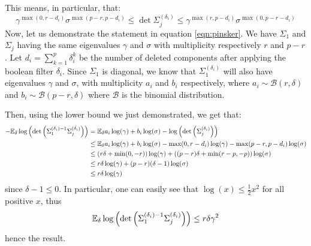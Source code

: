 \documentclass{article}
\numberwithin{equation}{section}
\numberwithin{equation}{section}
\begin{document}
            This means, in particular, that:
            \begin{equation}
                \gamma^{\max (0, r-d_i)} \sigma^{\max(p-r, p-d_i)} \leq \det \Sigma_j^{(\delta_i)} \leq \gamma^{\max (r, p-d_i)} \sigma^{\max(0, p-r-d_i)} 
            \end{equation}
            Now, let us demonstrate the statement in equation \ref{eqn:pinsker}. We have $\Sigma_1$ and $\Sigma_j$ having the same eigenvalues $\gamma$ and $\sigma$ with multiplicity respectively $r$ and $p-r$. Let $d_i = \sum_{k=1}^p \delta_i^k$ be the number of deleted components after applying the boolean filter $\delta_i$. Since $\Sigma_1$ is diagonal, we know that $\Sigma_1^{(\delta_i)}$ will also have eigenvalues $\gamma$ and $\sigma$, with multiplicity $a_i$ and $b_i$ respectively, where $a_i \sim \mathcal{B}(r, \delta)$ and $b_i \sim \mathcal{B}(p-r, \delta)$ where $\mathcal{B}$ is the binomial distribution.
            
            Then, using the lower bound we just demonstrated, we get that:
            \begin{equation}
                \begin{split}
                - \mathbb{E}_\delta \log \left(\det \left(\Sigma_1^{(\delta_i)-1} \Sigma_j^{(\delta_i)} \right) \right) & = \mathbb{E}_\delta a_i \log(\gamma) + b_i \log(\sigma) - \log \left( \det \left(\Sigma_j^{(\delta_i)} \right)\right)\\
                & \leq \mathbb{E}_\delta a_i \log(\gamma) + b_i \log(\sigma) -  \max (0, r-d_i)\log(\gamma) - \max(p-r, p-d_i)\log ( \sigma ) \\
                & \leq \left( r\delta + \min (0, -r) \right) \log (\gamma) + \left( (p-r)\delta + \min(r-p, - p)\right) \log (\sigma)\\
                & \leq r \delta \log(\gamma) + (p-r)(\delta - 1) \log(\sigma)\\
                & \leq r \delta \log(\gamma)
                \end{split}
            \end{equation}
            since $\delta - 1 \leq 0$. In particular, one can easily see that $\log(x) \leq \frac{1}{2} x^2$ for all positive $x$, thus
            \begin{equation}
                \mathbb{E}_\delta \log \left(\det \left(\Sigma_1^{(\delta_i)-1} \Sigma_j^{(\delta_i)} \right) \right) \leq r \delta \gamma^2
            \end{equation}
            hence the result.
        
\end{document}
